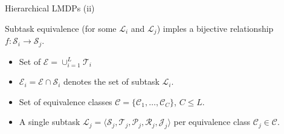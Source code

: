 \documentclass{beamer}
\theoremstyle{mystyle}
\newcommand{\cC}{\mathcal{C}}
\newcommand{\cE}{\mathcal{E}}
\newcommand{\cJ}{\mathcal{J}}
\newcommand{\cL}{\mathcal{L}}
\newcommand{\cP}{\mathcal{P}}
\newcommand{\cR}{\mathcal{R}}
\newcommand{\cS}{\mathcal{S}}
\newcommand{\cT}{\mathcal{T}}
\begin{document}
\begin{frame}{Hierarchical LMDPs (ii)}

    \begin{definition}
        Subtask equivalence (for some $\cL_i$ and $\cL_j$) imples a bijective relationship $f:\cS_i\rightarrow\cS_j$.
    \end{definition}

    \begin{itemize}

        \item Set of  {\color{blue}{\em exit states}} $\cE=\cup_{i=1}^L\cT_i$
        \item $\cE_i=\cE\cap\cS_i$ denotes the set of {\color{blue}{\em exit states inside}} subtask $\cL_i$.
        \item Set of {\color{blue} equivalence classes} $\cC=\{\cC_1,\ldots,\cC_C\}$, $C\leq L$.
        \item {\color{blue} A single subtask} $\cL_j=\langle\cS_j,\cT_j,\cP_j,\cR_j,\cJ_j\rangle$ {\color{blue} per equivalence class} $\cC_j\in\cC$.

    \end{itemize}


\end{frame}
\end{document}
